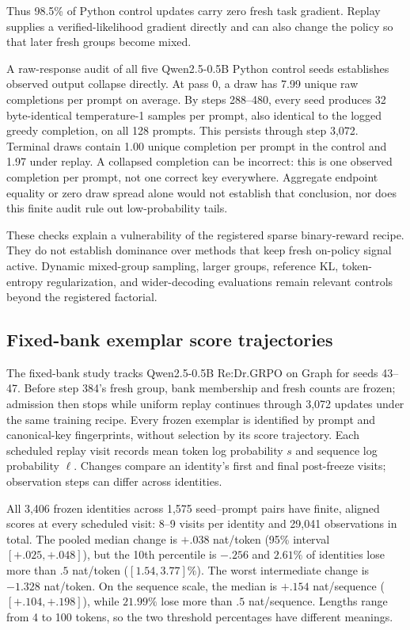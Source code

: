 \documentclass{article}
\newcommand{\1}{\mathbf 1}
\theoremstyle{remark}
\theoremstyle{definition}
\theoremstyle{plain}
\begin{document}
Thus 98.5\% of Python control updates carry zero fresh task gradient.
Replay supplies a verified-likelihood gradient directly and can also
change the policy so that later fresh groups become mixed.

A raw-response audit of all five Qwen2.5-0.5B Python control seeds establishes
observed output collapse directly. At pass 0, a draw has 7.99 unique raw
completions per prompt on average. By steps 288--480, every seed produces
32 byte-identical temperature-1 samples per prompt, also identical to the
logged greedy completion, on all 128 prompts. This persists through step
3,072. Terminal draws contain 1.00 unique completion per prompt in the
control and 1.97 under replay. A collapsed completion can be incorrect:
this is one observed completion per prompt, not one correct key everywhere.
Aggregate endpoint equality or zero draw spread alone would not establish
that conclusion, nor does this finite audit rule out low-probability tails.

These checks explain a vulnerability of the registered sparse binary-reward
recipe. They do not establish dominance over methods that keep fresh
on-policy signal active. Dynamic mixed-group sampling, larger groups,
reference KL, token-entropy regularization, and wider-decoding evaluations
remain relevant controls beyond the registered factorial.

\subsection{Fixed-bank exemplar score trajectories}
\label{app:fixed-bank-survival}

The fixed-bank study tracks Qwen2.5-0.5B Re:Dr.GRPO on Graph for seeds
43--47. Before step 384's fresh group, bank membership and fresh counts
are frozen; admission then stops while uniform replay continues through
3,072 updates under the same training recipe. Every frozen exemplar is
identified by prompt and canonical-key fingerprints, without selection by
its score trajectory. Each scheduled replay visit records mean token log
probability $s$ and sequence log probability $\ell$. Changes compare an
identity's first and final post-freeze visits; observation steps can differ
across identities.

All 3,406 frozen identities across 1,575 seed--prompt pairs have finite,
aligned scores at every scheduled visit: 8--9 visits per identity and
29,041 observations in total. The pooled median change is $+.038$
nat/token (95\% interval $[+.025,+.048]$), but the 10th percentile is
$-.256$ and $2.61\%$ of identities lose more than $.5$ nat/token
($[1.54,3.77]\%$). The worst intermediate change is $-1.328$ nat/token.
On the sequence scale, the median is $+.154$ nat/sequence
($[+.104,+.198]$), while $21.99\%$ lose more than $.5$ nat/sequence.
Lengths range from 4 to 100 tokens, so the two threshold percentages have
different meanings.
\end{document}
